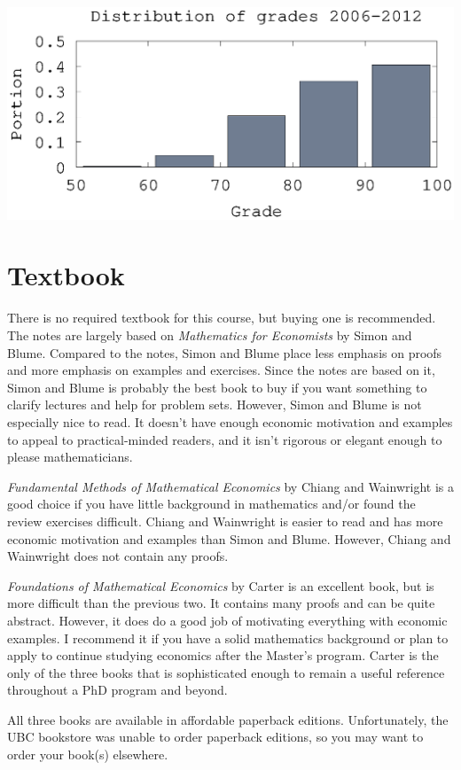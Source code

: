 \documentclass[10pt]{article}
\begin{document}
\begin{centering}
  \includegraphics[width=0.8\linewidth]{526gradeDist}
\end{centering}

\section{Textbook}

There is no required textbook for this course, but buying one is
recommended.  The notes are largely based on \textit{Mathematics for
  Economists} by Simon and Blume. Compared to the notes, Simon and
Blume place less emphasis on proofs and more emphasis on examples and
exercises. Since the notes are based on it, Simon and Blume is
probably the best book to buy if you want something to clarify
lectures and help for problem sets. However, Simon and Blume is not
especially nice to read. It doesn't have enough economic motivation
and examples to appeal to practical-minded readers, and it isn't
rigorous or elegant enough to please mathematicians.

\textit{Fundamental Methods of Mathematical Economics} by Chiang and
Wainwright is a good choice if you have little background in
mathematics and/or found the review exercises difficult. Chiang and
Wainwright is easier to read and has more economic motivation and
examples than Simon and Blume. However, Chiang and Wainwright does not
contain any proofs. 

\textit{Foundations of Mathematical Economics} by Carter is an excellent
book, but is more difficult than the previous two. It contains many
proofs and can be quite abstract. However, it does do a good job of
motivating everything with economic examples. I recommend it if you
have a solid mathematics background or plan to apply to continue
studying economics after the Master's program. Carter is the only of
the three books that is sophisticated enough to remain a useful
reference throughout a PhD program and beyond.

All three books are available in affordable paperback
editions. Unfortunately, the UBC bookstore was unable to order
paperback editions, so you may want to order your book(s) elsewhere. 
\end{document}
